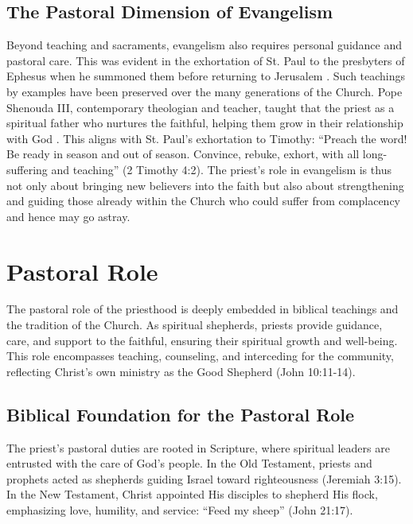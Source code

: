 \documentclass[12pt,doc]{apa7}   	%
\begin{document}
\subsection{The Pastoral Dimension of Evangelism}

Beyond teaching and sacraments, evangelism also requires personal guidance and pastoral care.  This was evident in the exhortation of St. Paul to the presbyters of Ephesus when he summoned them before returning to Jerusalem \citep{paul_wright}.  Such teachings by examples have been preserved over the many generations of the Church. Pope Shenouda III, contemporary theologian and teacher, taught that the priest as a spiritual father who nurtures the faithful, helping them grow in their relationship with God \citep{priesthood_shenouda}. This aligns with St. Paul’s exhortation to Timothy: “Preach the word! Be ready in season and out of season. Convince, rebuke, exhort, with all long-suffering and teaching” (2 Timothy 4:2). The priest’s role in evangelism is thus not only about bringing new believers into the faith but also about strengthening and guiding those already within the Church who could suffer from complacency and hence may go astray.


\section{Pastoral Role}\label{pastoral}

The pastoral role of the priesthood is deeply embedded in biblical teachings and the tradition of the Church. As spiritual shepherds, priests provide guidance, care, and support to the faithful, ensuring their spiritual growth and well-being. This role encompasses teaching, counseling, and interceding for the community, reflecting Christ’s own ministry as the Good Shepherd (John 10:11-14).

\subsection{Biblical Foundation for the Pastoral Role}

The priest’s pastoral duties are rooted in Scripture, where spiritual leaders are entrusted with the care of God’s people. In the Old Testament, priests and prophets acted as shepherds guiding Israel toward righteousness (Jeremiah 3:15). In the New Testament, Christ appointed His disciples to shepherd His flock, emphasizing love, humility, and service: ``Feed my sheep'' (John 21:17).
\end{document}
